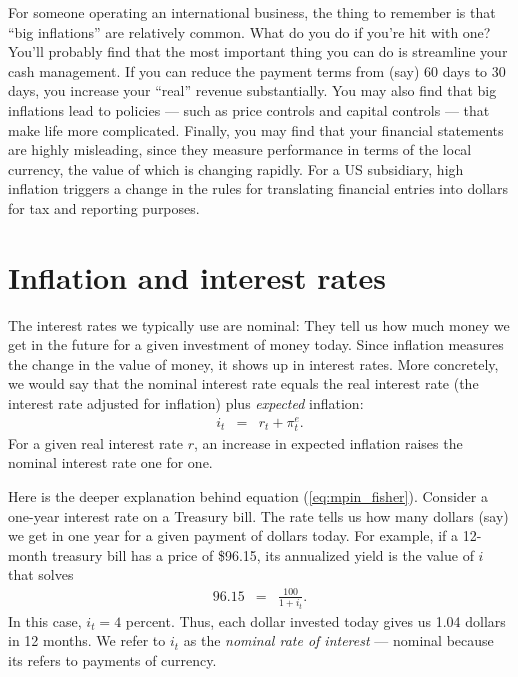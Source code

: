 For someone operating an international business,
the thing to remember is that ``big inflations''
are relatively common.
What do you do if you're hit with one?
You'll probably find that the
most important thing you can do is streamline your cash management.
If you can reduce the payment
terms from (say) 60 days to 30 days, you increase your ``real'' revenue substantially.
You may also find that big inflations lead to policies --- such as price controls and capital controls --- that make life more complicated.
Finally, you may find that your financial statements
are highly misleading, since they measure performance in terms of the local
currency, the value of which is changing rapidly.
For a US subsidiary, high inflation triggers a change
in the rules for translating financial entries into dollars for tax and reporting purposes.

\section{Inflation and interest rates}

The interest rates we typically use are nominal: They tell us how much money we get in the future
for a given investment of money today.
Since inflation measures the change in the value
of money, it shows up in interest rates.
More concretely, we would say that the nominal interest
rate equals the real interest rate (the interest rate
adjusted for inflation) plus \textit{expected} inflation:
\begin{eqnarray}
    i_t &=& r_t + \pi_t^e .
    \label{eq:mpin_fisher}
\end{eqnarray}
For a given real interest rate $r$,
an increase in expected inflation raises the nominal interest rate
one for one.


Here is the deeper explanation behind equation (\ref{eq:mpin_fisher}).
Consider a one-year interest rate on a Treasury bill.
The rate tells us how many dollars (say)
we get in one year for a given payment of dollars today.
For example, if a 12-month treasury bill has a price
of \$96.15, its annualized yield is the value of $i$ that solves
%
\begin{eqnarray}
    96.15 &=& \frac{100}{1+i_t}.
    \label{eq:nominal_yield}
\end{eqnarray}
%
In this case, $i_t = 4$ percent.  Thus, each dollar invested today gives us
1.04 dollars in 12 months.
We refer to $i_t$ as the  {\it nominal rate of interest\/} --- nominal because its refers to payments of currency.


